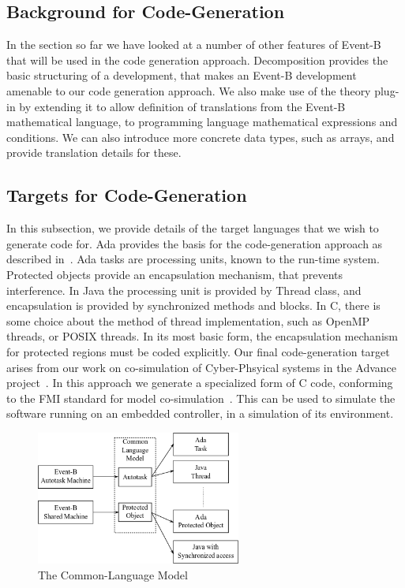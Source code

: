 \subsection{Background for Code-Generation}
In the section so far we have looked at a number of other features of Event-B that will be used in the code generation approach. Decomposition provides the basic structuring of a development, that makes an Event-B development amenable to our code generation approach. We also make use of the theory plug-in by extending it to allow definition of translations from the Event-B mathematical language, to programming language mathematical expressions and conditions. We can also introduce more concrete data types, such as arrays, and provide translation details for these. 

\subsection{Targets for Code-Generation}
In this subsection, we provide details of the target languages that we wish to generate code for. Ada provides the basis for the code-generation approach as described in~\cite{Edmunds2012a}. Ada tasks are processing units, known to the run-time system. Protected objects provide an encapsulation mechanism, that prevents interference. In Java the processing unit is provided by Thread class, and encapsulation is provided by synchronized methods and blocks. In C, there is some choice about the method of thread implementation, such as OpenMP~\cite{openmp} threads, or POSIX threads\cite{pthreads}. In its most basic form, the encapsulation mechanism for protected regions must be coded explicitly. Our final code-generation target arises from our work on co-simulation of Cyber-Phsyical systems in the Advance project~\cite{advance}. In this approach we generate a specialized form of C code, conforming to the FMI standard for model co-simulation~\cite{FMISTD}. This can be used to simulate the software running on an embedded controller, in a simulation of its environment.   
%
\begin{figure}
\centering
\includegraphics[width=0.6\textwidth]{graphics/B_IL1_others.png}
\caption{The Common-Language Model}
\label{fig:B_IL1_others}
\end{figure}
